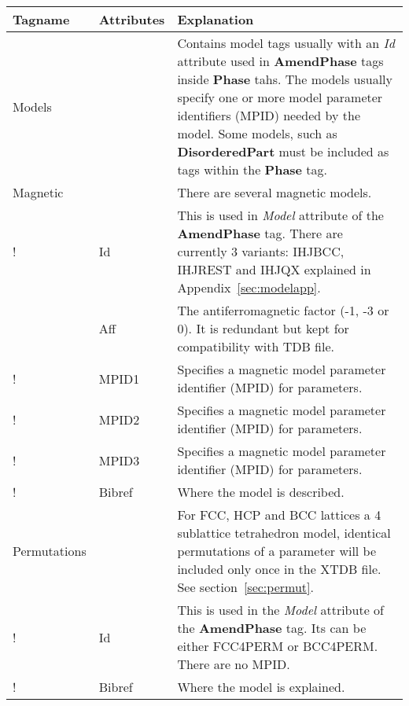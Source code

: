 \documentclass{article}
\begin{document}
\bigskip
\begin{tabular}{|p{} p{} p{}|}\hline
  Tagname& Attributes & Explanation\\\hline

  Models & & Contains model tags usually with an {\em Id} attribute
               used in {\bf AmendPhase} tags inside {\bf Phase} tahs.  
               The models usually specify one or more model parameter 
               identifiers (MPID) needed by the model.  Some models, 
               such as {\bf DisorderedPart}  must be included as tags 
               within the {\bf Phase} tag.\\\hline
%

  Magnetic & & There are several magnetic models.\\
!      & Id & This is used in {\em Model} attribute of the 
               {\bf AmendPhase} tag.  There are currently 3 variants:
               IHJBCC, IHJREST and IHJQX explained 
               in Appendix~\ref{sec:modelapp}. \\
      & Aff   & The antiferromagnetic factor (-1, -3 or 0).  It is
                 redundant but kept for compatibility with TDB file.\\
!      & MPID1 & Specifies a magnetic model parameter 
                    identifier (MPID) for parameters.\\
!      & MPID2 & Specifies a magnetic model parameter 
                    identifier (MPID) for parameters.\\
!      & MPID3 & Specifies a magnetic model parameter 
                    identifier (MPID) for parameters.\\
!      & Bibref & Where the model is described.\\\hline

 Permutations & & For FCC, HCP and BCC lattices a 4 sublattice tetrahedron
                model, identical permutations of a parameter will be included 
                only once in the XTDB file.  See section~\ref{sec:permut}.\\
!     & Id & This is used in the {\em Model} attribute of the
                {\bf AmendPhase} tag.  Its can be either FCC4PERM or BCC4PERM.
                There are no MPID. \\
!     & Bibref & Where the model is explained.\\\hline

\end{tabular}
\end{document}
